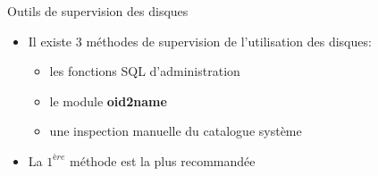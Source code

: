 \begin{frame}{Outils de supervision des disques}

\begin{itemize}

   \item Il existe 3 méthodes de supervision de l'utilisation des disques:
   \begin{itemize}
      \item les fonctions SQL d'administration
      \item le module \textbf{oid2name}
      \item une inspection manuelle du catalogue système
   \end{itemize}
\item La $1^{ère}$ méthode est la plus recommandée

\end{itemize}

\begin{toile}
\end{toile}

\end{frame}


